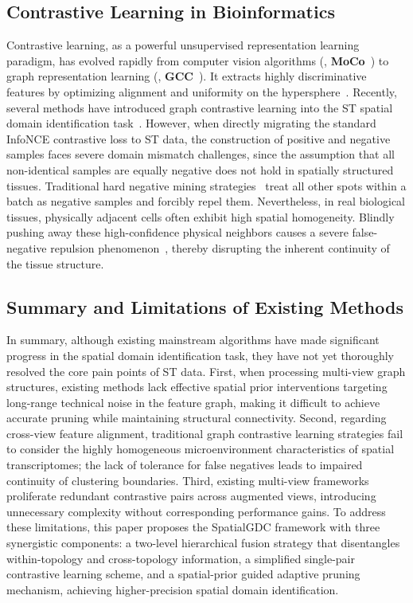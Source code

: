 \documentclass[lettersize,journal]{IEEEtran}
\begin{document}
\subsection{Contrastive Learning in Bioinformatics}
Contrastive learning, as a powerful unsupervised representation learning paradigm, has evolved rapidly from computer vision algorithms (\eg, \textbf{MoCo}~\cite{he2020momentum}) to graph representation learning (\eg, \textbf{GCC}~\cite{qiu2020gcc}). It extracts highly discriminative features by optimizing alignment and uniformity on the hypersphere~\cite{oord2018infonce}. Recently, several methods have introduced graph contrastive learning into the ST spatial domain identification task~\cite{you2020graphcl}. However, when directly migrating the standard InfoNCE contrastive loss to ST data, the construction of positive and negative samples faces severe domain mismatch challenges, since the assumption that all non-identical samples are equally negative does not hold in spatially structured tissues. Traditional hard negative mining strategies~\cite{robinson2020contrastive} treat all other spots within a batch as negative samples and forcibly repel them. Nevertheless, in real biological tissues, physically adjacent cells often exhibit high spatial homogeneity. Blindly pushing away these high-confidence physical neighbors causes a severe false-negative repulsion phenomenon~\cite{chuang2020debiased}, thereby disrupting the inherent continuity of the tissue structure.

\subsection{Summary and Limitations of Existing Methods}
In summary, although existing mainstream algorithms have made significant progress in the spatial domain identification task, they have not yet thoroughly resolved the core pain points of ST data. First, when processing multi-view graph structures, existing methods lack effective spatial prior interventions targeting long-range technical noise in the feature graph, making it difficult to achieve accurate pruning while maintaining structural connectivity. Second, regarding cross-view feature alignment, traditional graph contrastive learning strategies fail to consider the highly homogeneous microenvironment characteristics of spatial transcriptomes; the lack of tolerance for false negatives leads to impaired continuity of clustering boundaries. Third, existing multi-view frameworks proliferate redundant contrastive pairs across augmented views, introducing unnecessary complexity without corresponding performance gains. To address these limitations, this paper proposes the SpatialGDC framework with three synergistic components: a two-level hierarchical fusion strategy that disentangles within-topology and cross-topology information, a simplified single-pair contrastive learning scheme, and a spatial-prior guided adaptive pruning mechanism, achieving higher-precision spatial domain identification.
\end{document}
